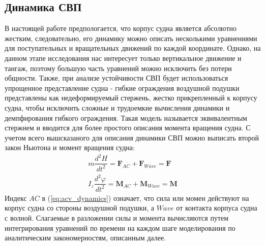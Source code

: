 \begin{centering}
    \subsection{Динамика СВП} %
\end{centering}

В настоящей работе предпологается, что корпус судна является абсолютно жестким, следовательно, его динамику можно описать несколькими уравнениями для поступательных и вращательных движений по каждой координате. Однако, на данном этапе исследования нас интересует только вертикальное движение и тангаж, поэтому большую часть уравнений можно исключить без потери общности. Также, при анализе устойчивости СВП будет использоваться упрощенное представление судна - гибкие ограждения воздушной подушки представлены как недеформируемый стержень, жестко прикрепленный к корпусу судна, чтобы исключить сложные и трудоемкие вычисления динамики и демпфирования гибкого ограждения. Такая модель называется эквивалентным стержнем и вводится для более простого описания момента вращения судна. С учетом всего вышсказаного для описания динамики СВП можно выписать второй закон Ньютона и момент вращения судна:
\begin{equation}\label{eq:acv_dynamics}
    \begin{gathered}
        m\dfrac{d^2H}{dt^2}=\mathbf{F}_{AC} + \mathbf{F}_{Wave} = \mathbf{F}\\
        I_z\dfrac{d^2\varphi}{dt^2}=\mathbf{M}_{AC} + \mathbf{M}_{Wave} = \mathbf{M}
    \end{gathered}
\end{equation}
Индекс $AC$ в (\ref{eq:acv_dynamics}) означает, что сила или момен действуют на корпус судна со стороны воздушной подушки, а $Wave$ от контакта корпуса судна с волной. Слагаемые в разложении силы и момента вычисляются путем интегрирования уравнений по времени на каждом шаге моделирования по аналитическим закономерностям, описанным далее.
